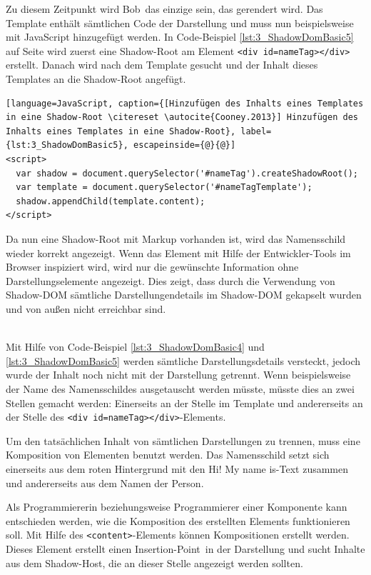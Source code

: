 \begin{enumerate}
Zu diesem Zeitpunkt wird \glqq Bob\grqq\ das einzige sein, das gerendert wird. Das Template enthält sämtlichen Code der Darstellung und muss nun beispielsweise mit JavaScript hinzugefügt werden. In Code-Beispiel \ref{lst:3_ShadowDomBasic5} auf Seite \pageref{lst:3_ShadowDomBasic5} wird zuerst eine Shadow-Root am Element \lstinline|<div id=nameTag></div>| erstellt. Danach wird nach dem Template gesucht und der Inhalt dieses Templates an die Shadow-Root angefügt.

\begin{lstlisting}[language=JavaScript, caption={[Hinzufügen des Inhalts eines Templates in eine Shadow-Root \citereset \autocite{Cooney.2013}] Hinzufügen des Inhalts eines Templates in eine Shadow-Root}, label={lst:3_ShadowDomBasic5}, escapeinside={@}{@}]
<script>
  var shadow = document.querySelector('#nameTag').createShadowRoot();
  var template = document.querySelector('#nameTagTemplate');
  shadow.appendChild(template.content);
</script>
\end{lstlisting}

Da nun eine Shadow-Root mit Markup vorhanden ist, wird das Namensschild wieder korrekt angezeigt. Wenn das Element mit Hilfe der Entwickler-Tools im Browser inspiziert wird, wird nur die gewünschte Information ohne Darstellungselemente angezeigt. Dies zeigt, dass durch die Verwendung von Shadow-DOM sämtliche Darstellungendetails im Shadow-DOM gekapselt wurden und von außen nicht erreichbar sind.

 \hfill \\
Mit Hilfe von Code-Beispiel \ref{lst:3_ShadowDomBasic4} und \ref{lst:3_ShadowDomBasic5} werden sämtliche Darstellungsdetails versteckt, jedoch wurde der Inhalt noch nicht mit der Darstellung getrennt. Wenn beispielsweise der Name des Namensschildes ausgetauscht werden müsste, müsste dies an zwei Stellen gemacht werden: Einerseits an der Stelle im Template und andererseits an der Stelle des \lstinline|<div id=nameTag></div>|-Elements.

Um den tatsächlichen Inhalt von sämtlichen Darstellungen zu trennen, muss eine Komposition von Elementen benutzt werden. Das Namensschild setzt sich einerseits aus dem roten Hintergrund mit den \glqq Hi! My name is\grqq -Text zusammen und andererseits aus dem Namen der Person.

Als Programmiererin beziehungsweise Programmierer einer Komponente kann entschieden werden, wie die Komposition des erstellten Elements funktionieren soll. Mit Hilfe des \lstinline|<content>|-Elements können Kompositionen erstellt werden. Dieses Element erstellt einen \glqq Insertion-Point\grqq\ in der Darstellung und sucht Inhalte aus dem Shadow-Host, die an dieser Stelle angezeigt werden sollten.


\end{enumerate}
